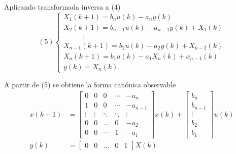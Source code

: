 Aplicando transformada inversa  a (4)
\[(5)
    \left\{
        \begin{array}{lll}
            X_{1}(k+1) = b_{n}u(k)-a_{n}y(k) \\ 
            X_{2}(k+1) = b_{n-1}u(k)-a_{n-1}y(k)+X_{1}(k) \\
            \;\;\;\;\;\;\;\;\;\; \vdots \\
            X_{n-1}(k+1) = b_{2}u(k)-a_{2}y(k) + X_{n-2}(k) \\
            X_{n}(k+1) = b_{1}u(k)-a_{1}X_{n}(k)+x_{n-1}(k) \\
            y(k) = X_{n}(k)
        \end{array}
    \right.
\]

A partir de (5) se obtiene la forma canónica observable
\[
    \begin{split}
        x(k+1) & = 
        \begin{bmatrix}
            0 & 0 & 0 & \cdots & -a_{n} \\
            1 & 0 & 0 & \cdots & -a_{n-1} \\
            \vdots & \vdots & \ddots & \ddots & \vdots \\
            0 & 0 & \ldots & 0 & -a_{2} \\
            0 & 0 & \cdots & 1 & -a_{1}
        \end{bmatrix}x(k) +
        \begin{bmatrix}
            b_{n} \\ b_{n-1} \\ \vdots \\ b_{2} \\ b_{1}
        \end{bmatrix}u(k) \\
        y(k) & = 
        \begin{bmatrix}
            0 & 0 & \ldots & 0 & 1    
        \end{bmatrix} X(k)
    \end{split}
\]